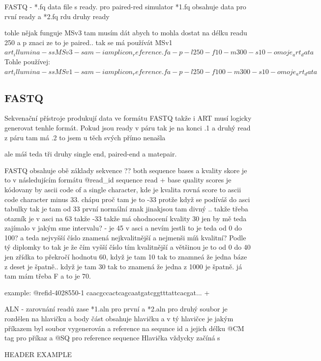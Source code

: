\documentclass[czech,DP]{thesiskiv}
\begin{document}
FASTQ - *.fq data file s ready. pro paired-red simulator
*1.fq obsahuje data pro rvní ready a *2.fq rdu druhy ready

tohle nějak funguje
MSv3 tam musím dát abych to mohla dostat na délku readu 250 a p znaci ze to je paired.. 
tak se má používát MSv1
$art_illumina -ss MSv3 -sam -i amplicon_reference.fa -p -l 250 -f 10 -m 300 -s 10 -o moje_art_data$
Tohle používej:
$art_illumina -ss MSv1 -sam -i amplicon_reference.fa -p -l 250 -f 100 -m 300 -s 10 -o moje_art_data$

\subsection{FASTQ}
Sekvenační přístroje produkují data ve formátu FASTQ takže i ART musí logicky generovat tenhle formát.
Pokud jsou ready v páru tak je na konci .1
a druhý read z páru tam má .2 to jsem u těch svých přímo nenašla 

ale máš teda tři druhy single end, paired-end a matepair. 

FASTQ obsahuje obě základy sekvence ?? both sequence bases a kvality skore je to v následujícím formátu
@read\_id
sequence read
+
base quality scores je kódovany by ascii code of a single character, kde je kvalita rovná score to ascii code character minus 33. chápu proč tam je to -33 protže když se podíváš do asci tabulky tak je tam od 33 první normální znak jinakjsou tam divný .. 
takže třeba otazník je v asci na 63 takže -33 takže má ohodnocení kvality 30
jen by mě teda zajímalo v jakým sme intervalu? - je 45 v asci a nevím jestli to je teda od 0 do 100?  a teda nejvyšší číslo znamená nejkvalitnější a nejmenši míň kvalitní? Podle tý diplomky to tak je že čím vyšší číslo tím kvalitnější a většinou je to od 0 do 40 jen zřídka to překročí hodnotu 60, když je tam 10 tak to znamneá že jedna báze z deset je špatně.. když je tam 30 tak to znamená že jedna z 1000 je špatně.
já tam mám třeba F a to je 70.

example:
		@refid-4028550-1 
		caacgccactcagcaatgatcggtttattcacgat...
		+ 

ALN - zarovnání readů
zase *1.aln pro první a *2.aln pro druhý
soubor je rozdělen na hlavičku a body část
obsahuje hlavičku a v tý hlavičce je jakým příkazem byl soubor vygenerován a reference na sequnce id a jejich délku
@CM tag pro příkaz a
@SQ pro reference sequence
Hlavička vždycky začíná s 

		HEADER EXAMPLE
\end{document}
